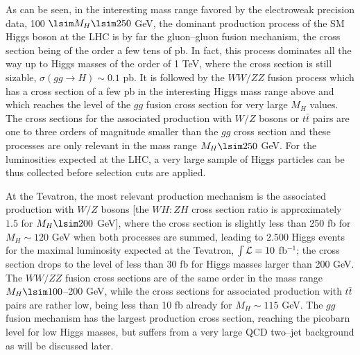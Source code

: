 As can be seen, in the interesting mass range favored by the electroweak
precision data, 100 $\lsim M_H \lsim 250$ GeV, the dominant production process
of the SM Higgs boson  at the LHC is by far the gluon--gluon fusion mechanism, 
the cross section being of the order a few tens of pb. In fact, this process
dominates all the way up to Higgs masses of the order of 1 TeV, where the cross
section is still sizable, $\sigma ( gg \to H) \sim 0.1$ pb.  It is followed by
the $WW/ZZ$ fusion process which has a  cross section of a few pb in the
interesting Higgs mass range above and which reaches the level of the $gg$
fusion cross section for very large $M_H$ values.  The cross sections for the
associated production with $W/Z$ bosons or $t\bar{t}$ pairs are one to three
orders of magnitude smaller than the $gg$ cross section and these processes
are only relevant in the mass range $M_H \lsim 250$ GeV.  For the luminosities
expected at the LHC, a very large sample of Higgs particles can be thus
collected before selection cuts are applied.\s

At the Tevatron, the most relevant production mechanism is the associated
production with $W/Z$ bosons [the $WH:ZH$ cross section ratio is approximately
$1.5$ for $M_H \lsim 200$ GeV], where the cross section is slightly less than
250 fb for $M_H \sim 120$ GeV when both processes are summed, leading to
$2.500$ Higgs events for the maximal luminosity expected at the Tevatron, $\int
{\cal L}=10$ fb$^{-1}$; the cross section drops to the level of less than 30 fb
for Higgs masses larger than 200 GeV. The $WW/ZZ$ fusion cross sections are of
the same order in the mass range $M_H \lsim 100$--200 GeV, while the cross
sections for associated production with $t\bar{t}$ pairs are rather low, being
less than 10 fb already for $M_H \sim 115$ GeV. The $gg$ fusion mechanism has
the largest production cross section, reaching the picobarn level for low Higgs
masses,  but suffers from a very large QCD two--jet background as will be
discussed later. \s

